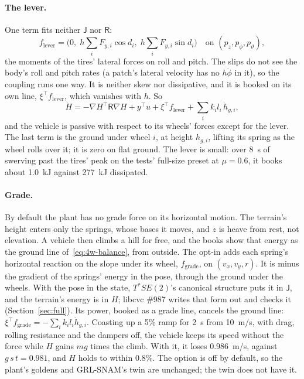\documentclass[11pt]{article}
\theoremstyle{remark}
\newcommand{\J}{\mathsf J}
\newcommand{\R}{\mathsf R}
\newcommand{\T}{^{\top}}
\begin{document}
\paragraph{The lever.} One term fits neither $\J$ nor $\R$:
\begin{equation*}
  f_{\mathrm{lever}}=\big(0,\;h\textstyle\sum_iF_{y,i}\cos d_i,\;h\sum_iF_{y,i}\sin d_i\big)
  \quad\text{on }(p_z,p_\phi,p_\vartheta),
\end{equation*}
the moments of the tires' lateral forces on roll and pitch. The slips do
not see the body's roll and pitch rates (a patch's lateral velocity has no $h\dot\phi$ in it), so
the coupling runs one way. It is neither skew nor dissipative, and it is booked on its own line,
$\xi\T f_{\mathrm{lever}}$, which vanishes with $h$. So
\begin{equation}
  \dot H=-\nabla H\T\R\nabla H+y\T u+\xi\T f_{\mathrm{lever}}+\textstyle\sum_ik_il_i\,\dot h_{g,i},
  \label{eq:4w-balance}
\end{equation}
and the vehicle is passive with respect to its wheels' forces except for the lever. The last term
is the ground under wheel $i$, at height $h_{g,i}$, lifting its spring as the wheel rolls over it;
it is zero on flat ground. The lever is small: over 8~s of swerving past the tires' peak on the
tests' full-size preset at $\mu=0.6$, it books about 1.0~kJ against 277~kJ dissipated.

\paragraph{Grade.} By default the plant has no grade force on its horizontal motion. The terrain's
height enters only the springs, whose bases it moves, and $z$ is heave from rest, not elevation. A
vehicle then climbs a hill for free, and the books show that energy as the ground line
of~\eqref{eq:4w-balance}, from outside. The opt-in  adds each
spring's horizontal reaction on the slope under its wheel, $f_{\mathrm{grade}}$, on $(v_x,v_y,r)$.
It is minus the gradient of the springs' energy in the pose, through the ground under the wheels.
With the pose in the state, $T^*SE(2)$'s canonical structure puts it in $\J$, and the terrain's
energy is in $H$; libcvc \#987 writes that form out and checks it (Section~\ref{sec:full}). Its power, booked as a grade line, cancels the ground line:
$\xi\T f_{\mathrm{grade}}=-\sum_ik_il_i\dot h_{g,i}$. Coasting up a 5\% ramp for 2~s from 10~m/s,
with drag, rolling resistance and the dampers off, the vehicle keeps its speed without the force
while $H$ gains $mg$ times the climb. With it, it loses 0.986~m/s, against $g\,s\,t=0.981$, and $H$
holds to within 0.8\%. The option is off by default, so the plant's goldens and GRL-SNAM's
 twin are unchanged; the twin does not have it.
\end{document}
